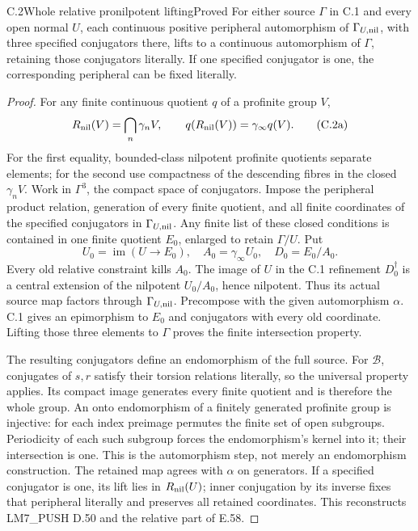 \begin{statement}{C.2}{Whole relative pronilpotent lifting}{Proved}
For either source \(\Gamma\) in C.1 and every open normal \(U\),
each continuous positive peripheral automorphism of
\(\Gamma_{U,\rm nil}\), with three specified conjugators there,
lifts to a continuous automorphism of \(\Gamma\), retaining
those conjugators literally. If one specified conjugator is one,
the corresponding peripheral can be fixed literally.
\end{statement}
\begin{proof}
For any finite continuous quotient \(q\) of a profinite group \(V\),
\[
 R_{\rm nil}(V)=\bigcap_n\gamma_nV,\qquad
 q(R_{\rm nil}(V))=\gamma_\infty q(V).
 \tag{C.2a}
\]
For the first equality, bounded-class nilpotent profinite quotients
separate elements; for the second use compactness of the descending
fibres in the closed \(\gamma_nV\).
Work in \(\Gamma^3\), the compact space of conjugators.
Impose the peripheral product relation, generation of every finite
quotient, and all finite coordinates of the specified conjugators
in \(\Gamma_{U,\rm nil}\). Any finite list of these closed conditions
is contained in one finite quotient \(E_0\), enlarged to retain
\(\Gamma/U\). Put
\[
 U_0=\operatorname{im}(U\to E_0),\quad
 A_0=\gamma_\infty U_0,\quad D_0=E_0/A_0.
 \tag{C.2b}
\]
Every old relative constraint kills \(A_0\).
The image of \(U\) in the C.1 refinement \(D_0^\dagger\)
is a central extension of the nilpotent \(U_0/A_0\), hence
nilpotent. Thus its actual source map factors through
\(\Gamma_{U,\rm nil}\). Precompose with the given automorphism
\(\alpha\). C.1 gives an epimorphism to \(E_0\) and conjugators
with every old coordinate. Lifting those three elements to
\(\Gamma\) proves the finite intersection property.

The resulting conjugators define an endomorphism of the full source.
For \(\mathcal B\), conjugates of \(s,r\) satisfy their torsion
relations literally, so the universal property applies.
Its compact image generates every finite quotient and is therefore
the whole group. An onto endomorphism of a finitely generated
profinite group is injective: for each index preimage permutes the
finite set of open subgroups. Periodicity of each such subgroup
forces the endomorphism's kernel into it; their intersection is one.
This is the automorphism step, not merely an endomorphism construction.
The retained map agrees with \(\alpha\) on generators.
If a specified conjugator is one, its lift lies in
\(R_{\rm nil}(U)\); inner conjugation by its inverse fixes that
peripheral literally and preserves all retained coordinates.
This reconstructs LM7\_PUSH D.50 and the relative part of E.58.
\end{proof}


